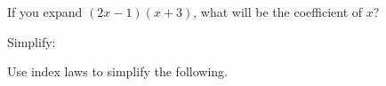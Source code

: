 \documentclass{source/quiz-exam}
\begin{document}
\begin{questions}
\question[1] If you expand $(2x-1)(x+3)$, what will be the coefficient of $x$?
\vspace{0.5cm}

\begin{oneparchoices}
\end{oneparchoices}
\vspace{1cm}

\question[4] Simplify: \droppoints
{}

\question Use index laws to simplify the following. \droptotalpoints
\vspace{1cm}
\end{questions}
\end{document}
